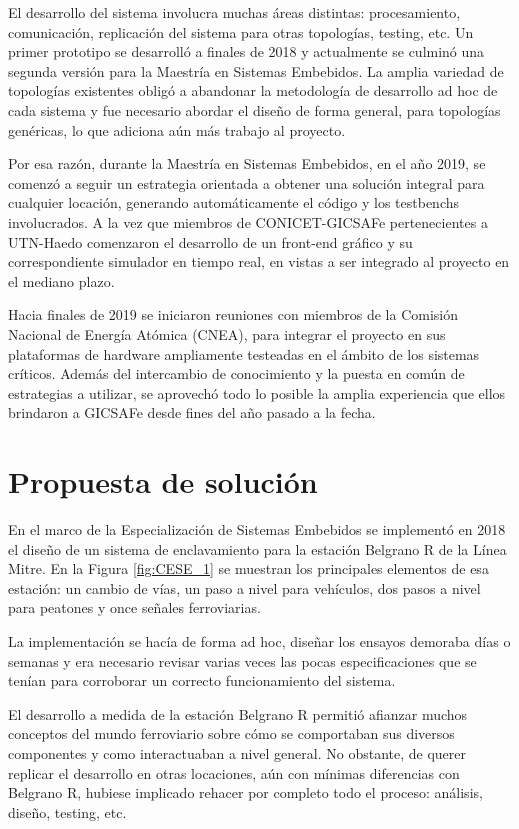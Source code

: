 		El desarrollo del sistema involucra muchas áreas distintas: procesamiento, comunicación, replicación del sistema para otras topologías, testing, etc. Un primer prototipo se desarrolló a finales de 2018 y actualmente se culminó una segunda versión para la Maestría en Sistemas Embebidos. La amplia variedad de topologías existentes obligó a abandonar la metodología de desarrollo ad hoc de cada sistema y fue necesario abordar el diseño de forma general, para topologías genéricas, lo que adiciona aún más trabajo al proyecto.		
		
		Por esa razón, durante la Maestría en Sistemas Embebidos, en el año 2019, se comenzó a seguir un estrategia orientada a obtener una solución integral para cualquier locación, generando automáticamente el código y los testbenchs involucrados. A la vez que miembros de CONICET-GICSAFe pertenecientes a UTN-Haedo comenzaron el desarrollo de un front-end gráfico y su correspondiente simulador en tiempo real, en vistas a ser integrado al proyecto en el mediano plazo.
	
		Hacia finales de 2019 se iniciaron reuniones con miembros de la Comisión Nacional de Energía Atómica (CNEA), para integrar el proyecto en sus plataformas de hardware ampliamente testeadas en el ámbito de los sistemas críticos. Además del intercambio de conocimiento y la puesta en común de estrategias a utilizar, se aprovechó todo lo posible la amplia experiencia que ellos brindaron a GICSAFe desde fines del año pasado a la fecha.
		
	\section{Propuesta de solución}	
		
		En el marco de la Especialización de Sistemas Embebidos se implementó en 2018 el diseño de un sistema de enclavamiento para la estación Belgrano R de la Línea Mitre. En la Figura \ref{fig:CESE_1} se muestran los principales elementos de esa estación: un cambio de vías, un paso a nivel para vehículos, dos pasos a nivel para peatones y once señales ferroviarias.	
		
		La implementación se hacía de forma ad hoc, diseñar los ensayos demoraba días o semanas y era necesario revisar varias veces las pocas especificaciones que se tenían para corroborar un correcto funcionamiento del sistema.	
		
		El desarrollo a medida de la estación Belgrano R permitió afianzar muchos conceptos del mundo ferroviario sobre cómo se comportaban sus diversos componentes y como interactuaban a nivel general. No obstante, de querer replicar el desarrollo en otras locaciones, aún con mínimas diferencias con Belgrano R, hubiese implicado rehacer por completo todo el proceso: análisis, diseño, testing, etc.
		
